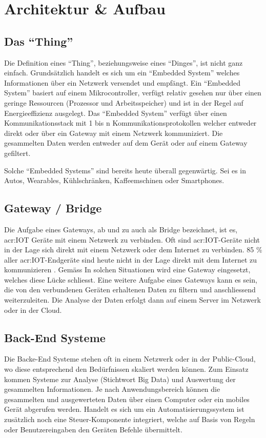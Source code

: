\section{Architektur \& Aufbau}


\subsection{Das "`Thing"'}
Die Definition eines "`Thing"', beziehungsweise eines "`Dinges"', ist nicht ganz einfach. Grundsätzlich handelt es sich um ein "`Embedded System"' welches Informationen über ein Netzwerk versendet und empfängt. Ein "`Embedded System"' basiert auf einem Mikrocontroller, verfügt relativ gesehen nur über einen geringe Ressourcen (Prozessor und Arbeitsspeicher) und ist in der Regel auf Energieeffizienz ausgelegt. Das "`Embedded System"' verfügt über einen Kommunikationsstack mit 1 bis n Kommunikationsprotokollen welcher entweder direkt oder über ein Gateway mit einem Netzwerk kommuniziert. Die gesammelten Daten werden entweder auf dem Gerät oder auf einem Gateway gefiltert. 

Solche "`Embedded Systems"' sind bereits heute überall gegenwärtig. Sei es in Autos, Wearables, Kühlschränken, Kaffeemschinen oder Smartphones.


\subsection{Gateway / Bridge}
Die Aufgabe eines Gateways, ab und zu auch als Bridge bezeichnet, ist es, \gls{acr:IOT} Geräte mit einem Netzwerk zu verbinden. Oft sind \gls{acr:IOT}-Geräte nicht in der Lage sich direkt mit einem Netzwerk oder dem Internet zu verbinden. 85 \% aller \gls{acr:IOT}-Endgeräte sind heute nicht in der Lage direkt mit dem Internet zu kommunizieren \cite[S. 2]{E:Intel:WhitePaper:DevelopingSolutionsIoT}. Gemäss In solchen Situationen wird eine Gateway eingesetzt, welches diese Lücke schliesst. Eine weitere Aufgabe eines Gateways kann es sein, die von den verbundenen Geräten erhaltenen Daten zu filtern und anschliessend weiterzuleiten. Die Analyse der Daten erfolgt dann auf einem Server im Netzwerk oder in der Cloud. 


\subsection{Back-End Systeme}
Die Backe-End Systeme stehen oft in einem Netzwerk oder in der Public-Cloud, wo diese entsprechend den Bedürfnissen skaliert werden können. Zum Einsatz kommen Systeme zur Analyse (Stichtwort Big Data) und Auswertung der gesammelten Informationen. Je nach Anwendungsbereich können die gesammelten und ausgewerteten Daten über einen Computer oder ein mobiles Gerät abgerufen werden. Handelt es sich um ein Automatisierungssystem ist zusätzlich noch eine Steuer-Komponente integriert, welche auf Basis von Regeln oder Benutzereingaben den Geräten Befehle übermittelt.


